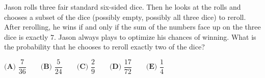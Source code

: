 Jason rolls three fair standard six-sided dice. Then he looks at the rolls and chooses a subset of the dice (possibly empty, possibly all three dice) to reroll. After rerolling, he wins if and only if the sum of the numbers face up on the three dice is exactly $7$. Jason always plays to optimize his chances of winning. What is the probability that he chooses to reroll exactly two of the dice?

$\textbf{(A) }\dfrac{7}{36}\qquad\textbf{(B) }\dfrac{5}{24}\qquad\textbf{(C) }\dfrac{2}{9}\qquad\textbf{(D) }\dfrac{17}{72}\qquad\textbf{(E) }\dfrac14$
